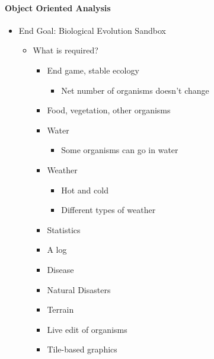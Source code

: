 \documentclass{ueacmpstyle}
\begin{document}
\paragraph{Object Oriented Analysis}
	\begin{itemize}
		\item End Goal: Biological Evolution Sandbox
		\begin{itemize}
			\item What is required?
			\begin{itemize}
				\item End game, stable ecology
					\begin{itemize}
						\item Net number of organisms doesn't change
					\end{itemize}
				\item Food, vegetation, other organisms
				\item Water
					\begin{itemize}
						\item Some organisms can go in water
					\end{itemize}
				\item Weather
					\begin{itemize}
						\item Hot and cold
						\item Different types of weather
					\end{itemize}
				\item Statistics
				\item A log
				\item Disease
				\item Natural Disasters
				\item Terrain
				\item Live edit of organisms
				\item Tile-based graphics
			\end{itemize}
		\end{itemize}
	\end{itemize}

\pagebreak
\end{document}
